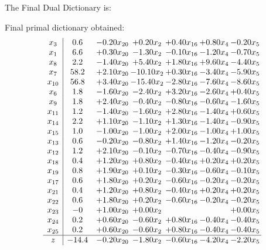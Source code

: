 \documentclass[8pt]{article}
\begin{document}
The Final Dual Dictionary is: 

 Final primal dictionary obtained: 
\[\begin{array}{c| c c@{\hskip 2pt} c@{\hskip 2pt} c@{\hskip 2pt} c@{\hskip 2pt} c@{\hskip 2pt} }
 x_{3}   &  0.6 & -0.20 x_{20} & +  0.20 x_{2} & +  0.40 x_{16} & +  0.80 x_{4} & -0.20 x_{5}\\
 x_{1}   &  6.6 & +  0.30 x_{20} & -1.30 x_{2} & -0.10 x_{16} & -1.20 x_{4} & -0.70 x_{5}\\
 x_{8}   &  2.2 & -1.40 x_{20} & +  5.40 x_{2} & +  1.80 x_{16} & +  9.60 x_{4} & -4.40 x_{5}\\
 x_{7}   &  58.2 & +  2.10 x_{20} & -10.10 x_{2} & +  0.30 x_{16} & -3.40 x_{4} & -5.90 x_{5}\\
 x_{10}   &  56.8 & +  3.40 x_{20} & -15.40 x_{2} & -2.80 x_{16} & -7.60 x_{4} & -8.60 x_{5}\\
 x_{6}   &  1.8 & -1.60 x_{20} & -2.40 x_{2} & +  3.20 x_{16} & -2.60 x_{4} & +  0.40 x_{5}\\
 x_{9}   &  1.8 & +  2.40 x_{20} & -0.40 x_{2} & -0.80 x_{16} & -0.60 x_{4} & -1.60 x_{5}\\
 x_{11}   &  1.2 & -1.40 x_{20} & -1.60 x_{2} & +  2.80 x_{16} & -1.40 x_{4} & +  0.60 x_{5}\\
 x_{14}   &  2.2 & +  1.10 x_{20} & -1.10 x_{2} & +  1.30 x_{16} & -1.40 x_{4} & -0.90 x_{5}\\
 x_{15}   &  1.0 & -1.00 x_{20} & -1.00 x_{2} & +  2.00 x_{16} & -1.00 x_{4} & +  1.00 x_{5}\\
 x_{13}   &  0.6 & -0.20 x_{20} & -0.80 x_{2} & +  1.40 x_{16} & -1.20 x_{4} & -0.20 x_{5}\\
 x_{12}   &  1.2 & +  2.10 x_{20} & -0.10 x_{2} & -0.70 x_{16} & -0.40 x_{4} & -0.90 x_{5}\\
 x_{18}   &  0.4 & +  1.20 x_{20} & +  0.80 x_{2} & -0.40 x_{16} & +  0.20 x_{4} & +  0.20 x_{5}\\
 x_{19}   &  0.8 & +  1.90 x_{20} & +  0.10 x_{2} & -0.30 x_{16} & -0.60 x_{4} & -0.10 x_{5}\\
 x_{17}   &  0.6 & +  1.80 x_{20} & +  0.20 x_{2} & -0.60 x_{16} & -0.20 x_{4} & -0.20 x_{5}\\
 x_{21}   &  0.4 & +  1.20 x_{20} & +  0.80 x_{2} & -0.40 x_{16} & +  0.20 x_{4} & +  0.20 x_{5}\\
 x_{22}   &  0.6 & +  1.80 x_{20} & +  0.20 x_{2} & -0.60 x_{16} & -0.20 x_{4} & -0.20 x_{5}\\
 x_{23}   &  -0 & +  1.00 x_{20} & +  0.00 x_{2} &    &   & +  0.00 x_{5}\\
 x_{24}   &  0.2 & +  0.60 x_{20} & -0.60 x_{2} & +  0.80 x_{16} & -0.40 x_{4} & -0.40 x_{5}\\
 x_{25}   &  0.2 & +  0.60 x_{20} & -0.60 x_{2} & +  0.80 x_{16} & -0.40 x_{4} & -0.40 x_{5}\\
\hline
z    &  -14.4 & -0.20 x_{20} & -1.80 x_{2} & -0.60 x_{16} & -4.20 x_{4} & -2.20 x_{5}\\
\end{array}\]
\end{document}
